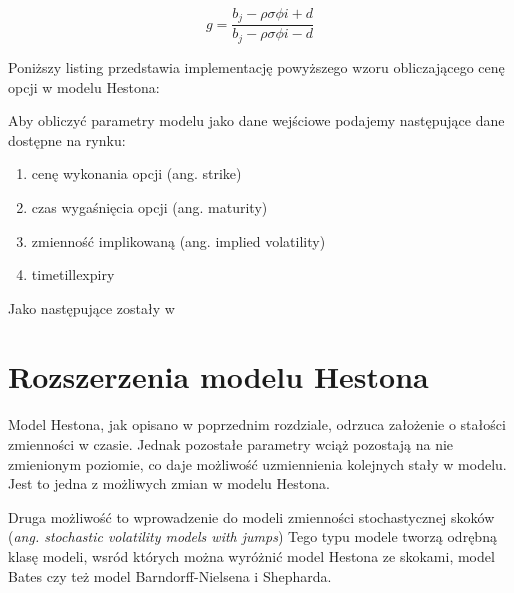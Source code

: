 \documentclass{pracamgr}
\begin{document}
\begin{equation}
g= \frac{b_j - \rho \sigma \phi i + d}{b_j - \rho \sigma \phi i - d}
\end{equation}

Poniższy listing przedstawia implementację powyższego wzoru obliczającego cenę opcji w modelu Hestona:





Aby obliczyć parametry modelu jako dane wejściowe podajemy następujące dane dostępne na rynku:
\begin{enumerate}
  \item cenę wykonania opcji (ang. strike)
  \item czas wygaśnięcia opcji (ang. maturity)
  \item zmienność implikowaną (ang. implied volatility)
  \item timetillexpiry
\end{enumerate}
Jako następujące zostały w

\chapter{Rozszerzenia modelu Hestona}

Model Hestona, jak opisano w poprzednim rozdziale, odrzuca założenie o stałości zmienności w czasie. 
Jednak pozostałe parametry wciąż pozostają na nie zmienionym poziomie, co daje możliwość uzmiennienia
kolejnych stały w modelu. Jest to jedna z możliwych zmian w modelu Hestona. 

Druga możliwość to wprowadzenie do modeli zmienności stochastycznej skoków (\textit{ang. stochastic volatility models with jumps})
Tego typu modele tworzą odrębną klasę modeli, wsród których można wyróżnić model Hestona ze skokami, 
model Bates czy też model Barndorff-Nielsena i Shepharda.
\end{document}
